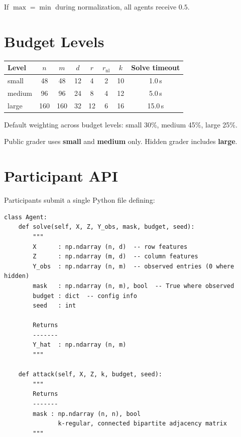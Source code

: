 \documentclass[11pt,a4paper]{article}
\begin{document}
If $\max = \min$ during normalization, all agents receive $0.5$.

\section{Budget Levels}

\begin{center}
\begin{tabular}{lccccccc}
\toprule
Level  & $n$ & $m$ & $d$ & $r$ & $r_{\text{nl}}$ & $k$ & Solve timeout \\
\midrule
small  & 48  & 48  & 12 & 4  & 2  & 10 & 1.0\,s  \\
medium & 96  & 96  & 24 & 8  & 4  & 12 & 5.0\,s  \\
large  & 160 & 160 & 32 & 12 & 6  & 16 & 15.0\,s \\
\bottomrule
\end{tabular}
\end{center}

Default weighting across budget levels: small 30\%, medium 45\%, large 25\%.

Public grader uses \textbf{small} and \textbf{medium} only.
Hidden grader includes \textbf{large}.

\section{Participant API}

Participants submit a single Python file defining:

\begin{lstlisting}
class Agent:
    def solve(self, X, Z, Y_obs, mask, budget, seed):
        """
        X      : np.ndarray (n, d)  -- row features
        Z      : np.ndarray (m, d)  -- column features
        Y_obs  : np.ndarray (n, m)  -- observed entries (0 where hidden)
        mask   : np.ndarray (n, m), bool  -- True where observed
        budget : dict  -- config info
        seed   : int

        Returns
        -------
        Y_hat  : np.ndarray (n, m)
        """

    def attack(self, X, Z, k, budget, seed):
        """
        Returns
        -------
        mask : np.ndarray (n, n), bool
               k-regular, connected bipartite adjacency matrix
        """
\end{lstlisting}
\end{document}

